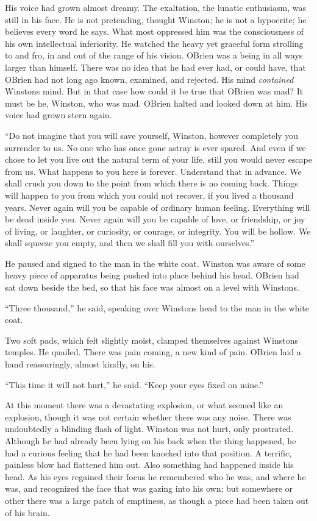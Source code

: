 His voice had grown almost dreamy. The exaltation, the lunatic
enthusiasm, was still in his face. He is not pretending, thought
Winston; he is not a hypocrite; he believes every word he says. What
most oppressed him was the consciousness of his own intellectual
inferiority. He watched the heavy yet graceful form strolling to and
fro, in and out of the range of his vision. O\textquotesingle Brien was
a being in all ways larger than himself. There was no idea that he had
ever had, or could have, that O\textquotesingle Brien had not long ago
known, examined, and rejected. His mind \emph{contained}
Winston\textquotesingle s mind. But in that case how could it be true
that O\textquotesingle Brien was mad? It must be he, Winston, who was
mad. O\textquotesingle Brien halted and looked down at him. His voice
had grown stern again.

``Do not imagine that you will save yourself, Winston, however completely
you surrender to us. No one who has once gone astray is ever spared. And
even if we chose to let you live out the natural term of your life,
still you would never escape from us. What happens to you here is
forever. Understand that in advance. We shall crush you down to the
point from which there is no coming back. Things will happen to you from
which you could not recover, if you lived a thousand years. Never again
will you be capable of ordinary human feeling. Everything will be dead
inside you. Never again will you be capable of love, or friendship, or
joy of living, or laughter, or curiosity, or courage, or integrity. You
will be hollow. We shall squeeze you empty, and then we shall fill you
with ourselves.''

He paused and signed to the man in the white coat. Winston was aware of
some heavy piece of apparatus being pushed into place behind his head.
O\textquotesingle Brien had sat down beside the bed, so that his face
was almost on a level with Winston\textquotesingle s.

``Three thousand,'' he said, speaking over Winston\textquotesingle s head
to the man in the white coat.

Two soft pads, which felt slightly moist, clamped themselves against
Winston\textquotesingle s temples. He quailed. There was pain coming, a
new kind of pain. O\textquotesingle Brien laid a hand reassuringly,
almost kindly, on his.

``This time it will not hurt,'' he said. ``Keep your eyes fixed on mine.''

At this moment there was a devastating explosion, or what seemed like an
explosion, though it was not certain whether there was any noise. There
was undoubtedly a blinding flash of light. Winston was not hurt, only
prostrated. Although he had already been lying on his back when the
thing happened, he had a curious feeling that he had been knocked into
that position. A terrific, painless blow had flattened him out. Also
something had happened inside his head. As his eyes regained their focus
he remembered who he was, and where he was, and recognized the face that
was gazing into his own; but somewhere or other there was a large patch
of emptiness, as though a piece had been taken out of his brain.

